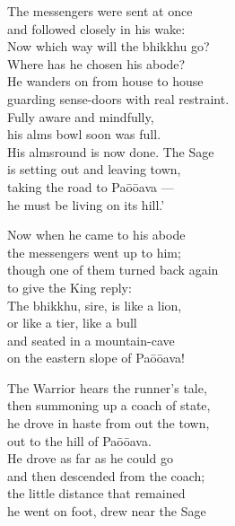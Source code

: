 \begin{MyDescription}[]{}
The messengers were sent at once\\
and followed closely in his wake:\\
Now which way will the bhikkhu go?\\
Where has he chosen his abode?\\
He wanders on from house to house\\
guarding sense-doors with real restraint.\\
Fully aware and mindfully,\\
his alms bowl soon was full.\\
His almsround is now done. The Sage\\
is setting out and leaving town,\\
taking the road to Pa\=o\=oava —\\
he must be living on its hill.'
\end{MyDescription}

\begin{MyDescription}[]{}
Now when he came to his abode\\
the messengers went up to him;\\
though one of them turned back again\\
to give the King reply:\\
The bhikkhu, sire, is like a lion,\\
or like a tier, like a bull\\
and seated in a mountain-cave\\
on the eastern slope of Pa\=o\=oava!
\end{MyDescription}

\begin{MyDescription}[]{}
The Warrior hears the runner's tale,\\
then summoning up a coach of state,\\
he drove in haste from out the town,\\
out to the hill of Pa\=o\=oava.\\
He drove as far as he could go\\
and then descended from the coach;\\
the little distance that remained\\
he went on foot, drew near the Sage
\end{MyDescription}

